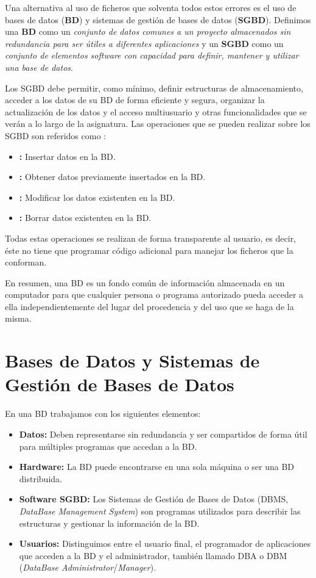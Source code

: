 Una alternativa al uso de ficheros que solventa todos estos errores es el uso de bases de datos (\textbf{BD}) y sistemas de gestión de bases de datos (\textbf{SGBD}).
Definimos una \textbf{BD} como un \textit{conjunto de datos comunes a un proyecto almacenados sin redundancia para ser útiles a diferentes aplicaciones} y un \textbf{SGBD} como un \textit{conjunto de elementos software con capacidad para definir, mantener y utilizar una base de datos}.

Los SGBD debe permitir, como mínimo, definir estructuras de almacenamiento, acceder a los datos de su BD de forma eficiente y segura, organizar la actualización de los datos y el acceso multiusuario y otras funcionalidades que se verán a lo largo de la asignatura. Las operaciones que se pueden realizar sobre los SGBD son referidos como :

\begin{itemize}
	\item{}\textbf{:} Insertar datos en la BD\@.
	\item{}\textbf{:} Obtener datos previamente insertados en la BD\@.
	\item{}\textbf{:} Modificar los datos existenten en la BD\@.
	\item{}\textbf{:} Borrar datos existenten en la BD\@.
\end{itemize}

Todas estas operaciones se realizan de forma transparente al usuario, es decir, éste no tiene que programar código adicional para manejar los ficheros que la conforman.

En resumen, una BD es un fondo común de información almacenada en un computador para que cualquier persona o programa autorizado pueda acceder a ella independientemente del lugar del procedencia y del uso que se haga de la misma.

\section{Bases de Datos y Sistemas de Gestión de Bases de Datos}

En una BD trabajamos con los siguientes elementos:

\begin{itemize}
	\item\textbf{Datos:} Deben representarse sin redundancia y ser compartidos de forma útil para múltiples programas que accedan a la BD\@.
	\item\textbf{Hardware:} La BD puede encontrarse en una sola máquina o ser una BD distribuida.
	\item\textbf{Software SGBD:} Los Sistemas de Gestión de Bases de Datos (DBMS, \textit{DataBase Management System}) son programas utilizados para describir las estructuras y gestionar la información de la BD\@.
	\item\textbf{Usuarios:} Distinguimos entre el usuario final, el programador de aplicaciones que acceden a la BD y el administrador, también llamado DBA o DBM (\textit{DataBase Administrator}/\textit{Manager}).
\end{itemize}

